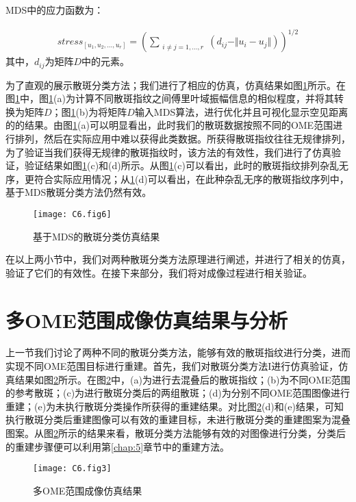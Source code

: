 MDS中的应力函数为：

\begin{equation}
\begin{aligned}
stress_{[u_1,u_2,\ldots, u_r]} =\left( \sum_{\substack{i\neq j = 1,\ldots,r} } (d_{ij}-\Vert u_{i}- u_{j} \Vert ) \right)^{1/2}
\label{eq:6.7}
\end{aligned}
\end{equation}
其中，$d_{ij}$为矩阵$D$中的元素。

为了直观的展示散斑分类方法；我们进行了相应的仿真，仿真结果如图\ref{fig:6.6}所示。在图\ref{fig:6.6}中，图\ref{fig:6.6}(a)为计算不同散斑指纹之间傅里叶域振幅信息的相似程度，并将其转换为矩阵$D$；图\ref{fig:6.6}(b)为将矩阵$D$输入MDS算法，进行优化并且可视化显示空见距离的的结果。由图\ref{fig:6.6}(a)可以明显看出，此时我们的散斑数据按照不同的OME范围进行排列，然后在实际应用中难以获得此类数据。所获得散斑指纹往往无规律排列，为了验证当我们获得无规律的散斑指纹时，该方法的有效性，我们进行了仿真验证，验证结果如图\ref{fig:6.6}(c)和(d)所示。从图\ref{fig:6.6}(c)可以看出，此时的散斑指纹排列杂乱无序，更符合实际应用情况；从\ref{fig:6.6}(d)可以看出，在此种杂乱无序的散斑指纹序列中，基于MDS散斑分类方法仍然有效。
\begin{figure}[htp]
	\centering
	\texttt{[image: C6.fig6]}
	\caption{基于MDS的散斑分类仿真结果}
	\label{fig:6.6}
\end{figure}

在以上两小节中，我们对两种散斑分类方法原理进行阐述，并进行了相关的仿真，验证了它们的有效性。在接下来部分，我们将对成像过程进行相关验证。

\section{多OME范围成像仿真结果与分析}

上一节我们讨论了两种不同的散斑分类方法，能够有效的散斑指纹进行分类，进而实现不同OME范围目标进行重建。首先，我们对散斑分类方法I进行仿真验证，仿真结果如图\ref{fig:6.3}所示。在图\ref{fig:6.3}中，(a)为进行去混叠后的散斑指纹；(b)为不同OME范围的参考散斑；(c)为进行散斑分类后的两组散斑；(d)为分别不同OME范围图像进行重建；(e)为未执行散斑分类操作所获得的重建结果。对比图\ref{fig:6.3}(d)和(e)结果，可知执行散斑分类后重建图像可以有效的重建目标，未进行散斑分类的重建图案为混叠图案。从图\ref{fig:6.3}所示的结果来看，散斑分类方法能够有效的对图像进行分类，分类后的重建步骤便可以利用第\ref{chap:5}章节中的重建方法。

\begin{figure}[htp]
	\centering
	\texttt{[image: C6.fig3]}
	\caption{多OME范围成像仿真结果}
	\label{fig:6.3}
\end{figure}

